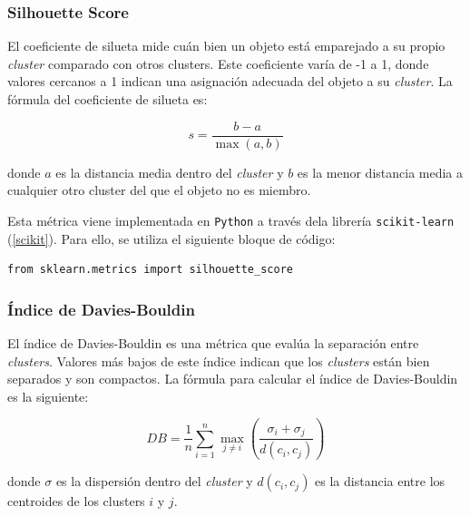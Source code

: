 \subsubsection*{Silhouette Score}

El coeficiente de silueta mide cuán bien un objeto está emparejado a su propio \textit{cluster} comparado con otros clusters. Este coeficiente varía de -1 a 1, donde valores cercanos a 1 indican una asignación adecuada del objeto a su \textit{cluster}. La fórmula del coeficiente de silueta es:

\begin{equation}
    s = \frac{b - a}{\max(a, b)}
\end{equation}

donde \(a\) es la distancia media dentro del \textit{cluster} y \(b\) es la menor distancia media a cualquier otro cluster del que el objeto no es miembro.

Esta métrica viene implementada en \texttt{Python} a través dela librería \texttt{scikit-learn} (\ref{scikit}). Para ello, se utiliza el siguiente bloque de código:

\begin{center}
    \begin{mdframed}
    \scriptsize
            \begin{verbatim}
from sklearn.metrics import silhouette_score
            \end{verbatim}
    \end{mdframed}
\end{center}

\subsubsection*{Índice de Davies-Bouldin}

El índice de Davies-Bouldin \cite{DaviesBouldin1979} es una métrica que evalúa la separación entre \textit{clusters}. Valores más bajos de este índice indican que los \textit{clusters} están bien separados y son compactos. La fórmula para calcular el índice de Davies-Bouldin \cite{petrovic2006comparison} es la siguiente:

\begin{equation}
    DB = \frac{1}{n} \sum_{i=1}^{n} \max_{j \neq i} \left( \frac{\sigma_i + \sigma_j}{d(c_i, c_j)} \right)
\end{equation}

donde \(\sigma\) es la dispersión dentro del \textit{cluster} y \(d(c_i, c_j)\) es la distancia entre los centroides de los clusters \(i\) y \(j\).

